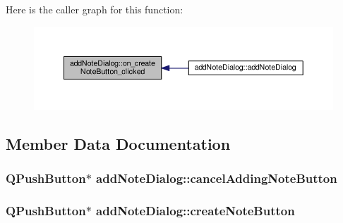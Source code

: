 Here is the caller graph for this function\+:
\nopagebreak
\begin{figure}[H]
\begin{center}
\leavevmode
\includegraphics[width=350pt]{classadd_note_dialog_a67b28dc05851888a45774eb240d6e43d_icgraph}
\end{center}
\end{figure}




\subsection{Member Data Documentation}
\subsubsection[{\texorpdfstring{cancel\+Adding\+Note\+Button}{cancelAddingNoteButton}}]{\setlength{\rightskip}{0pt plus 5cm}Q\+Push\+Button$\ast$ add\+Note\+Dialog\+::cancel\+Adding\+Note\+Button\hspace{0.3cm}{\ttfamily [private]}}\hypertarget{classadd_note_dialog_a00e515c4cf26af2ed6adfa554f69e64a}{}\label{classadd_note_dialog_a00e515c4cf26af2ed6adfa554f69e64a}
\subsubsection[{\texorpdfstring{create\+Note\+Button}{createNoteButton}}]{\setlength{\rightskip}{0pt plus 5cm}Q\+Push\+Button$\ast$ add\+Note\+Dialog\+::create\+Note\+Button\hspace{0.3cm}{\ttfamily [private]}}\hypertarget{classadd_note_dialog_aed9ae97b6b2c51728e9b995b952a92c2}{}\label{classadd_note_dialog_aed9ae97b6b2c51728e9b995b952a92c2}
